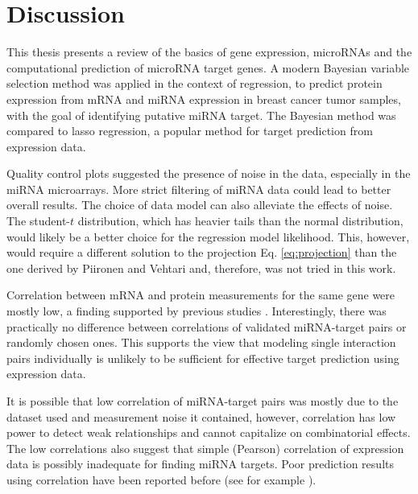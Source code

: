 
\section{Discussion}

This thesis presents a review of the basics of gene expression, microRNAs and
the computational prediction of microRNA target genes. A modern Bayesian
variable selection method was applied in the context of regression, to predict
protein expression from mRNA and miRNA expression in breast cancer tumor
samples, with the goal of identifying putative miRNA target. The Bayesian
method was compared to lasso regression, a popular method for target
prediction from expression data.

Quality control plots suggested the presence of noise in the data, especially
in the miRNA microarrays. More strict filtering of miRNA data could lead to
better overall results. The choice of data model can also alleviate the
effects of noise. The
student-$t$ distribution, which has heavier tails than the normal
distribution, would likely be a better choice for the regression model
likelihood. This, however, would require a different solution to the
projection Eq. \eqref{eq:projection} than the one derived by Piironen
and Vehtari \citep{Piironen2015} and, therefore, was not tried in this work.

Correlation between mRNA and protein measurements for the same gene were
mostly low, a finding supported by previous studies \citep{Payne2015}.
Interestingly, there was practically no difference between correlations of
validated miRNA-target pairs or randomly chosen ones. This supports the view
that modeling single interaction pairs individually is unlikely to be
sufficient for effective target prediction using expression data.

It is possible that low correlation of miRNA-target pairs was mostly due to the
dataset used and measurement noise it contained, however, 
correlation has low power to detect weak relationships and
cannot capitalize on combinatorial effects. The low correlations also suggest
that simple (Pearson) correlation of expression data is possibly inadequate for
finding miRNA targets. Poor prediction results using correlation have been
reported before (see for example \citep{Muniategui2012}).

